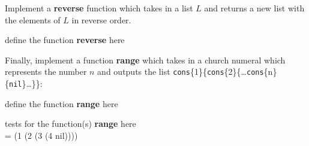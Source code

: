 \documentclass{article}
\newcommand{\op}[1]{\textbf{#1}}
\newcommand{\begintodo}[1]{\begin{center}define the function \op{#1} here\end{center}}
\newcommand{\finishtodo}[1]{}
\newcommand{\test}[2]{#1 = #2\par}
\newcommand{\begintests}[1]{\begin{center}tests for the function(s) \op{#1} here\\}
\newcommand{\finishtests}[1]{\end{center}}
\renewcommand{\c}[2]{\texttt{cons}\{#1\}\{#2\}}
\begin{document}
Implement a \op{reverse} function which takes in a list $L$ and returns a new list with the elements of $L$ 
in reverse order.

\begintodo{reverse}
\newcommand{\helpfive}[2]{\ifthenelse
        {\isempty{#2}}
        {#2}
        {\append{\car{#2}}{#1{\cdr{#2}}}}
    }
\newcommand{\reverse}[1]{\Y{\helpfive}{#1}}
\finishtodo{reverse}

Finally, implement a function \op{range} which takes in a church numeral which represents the number $n$ and
outputs the list \c{1}{\c{2}{\dots\c{n}{\texttt{nil}}\dots}}:

\begintodo{range}
\newcommand{\helpsix}[2]{\ifthenelse{\iszero{#2}}
    {\nil}
    {\cons
        {\printnum{#2}}
        {#1{\p{#2}}}
    }
}
\newcommand{\range}[1]{\reverse{\Y{\helpsix}{#1}}}
\finishtodo{range}

\begintests{range}
\test{\printlist{\range{\s{\s{\s{\s{\z}}}}}}}{(1 (2 (3 (4 nil))))}
\finishtests{range}
\end{document}
